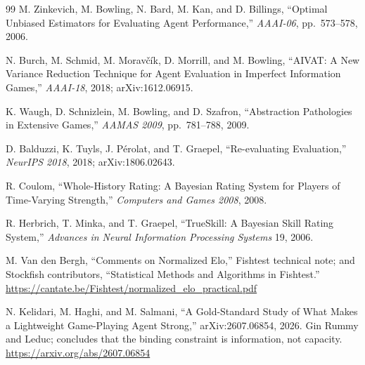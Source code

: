 \begin{thebibliography}{99}
M. Zinkevich, M. Bowling, N. Bard, M. Kan, and D. Billings, ``Optimal Unbiased
Estimators for Evaluating Agent Performance,'' \emph{AAAI-06}, pp.~573--578,
2006.

N. Burch, M. Schmid, M. Morav\v{c}\'ik, D. Morrill, and M. Bowling, ``AIVAT: A
New Variance Reduction Technique for Agent Evaluation in Imperfect Information
Games,'' \emph{AAAI-18}, 2018; arXiv:1612.06915.

K. Waugh, D. Schnizlein, M. Bowling, and D. Szafron, ``Abstraction Pathologies
in Extensive Games,'' \emph{AAMAS 2009}, pp.~781--788, 2009.

D. Balduzzi, K. Tuyls, J. P\'erolat, and T. Graepel, ``Re-evaluating
Evaluation,'' \emph{NeurIPS 2018}, 2018; arXiv:1806.02643.

R. Coulom, ``Whole-History Rating: A Bayesian Rating System for Players of
Time-Varying Strength,'' \emph{Computers and Games 2008}, 2008.

R. Herbrich, T. Minka, and T. Graepel, ``TrueSkill\texttrademark: A Bayesian
Skill Rating System,'' \emph{Advances in Neural Information Processing Systems}
19, 2006.

M. Van den Bergh, ``Comments on Normalized Elo,'' Fishtest technical note; and
Stockfish contributors, ``Statistical Methods and Algorithms in Fishtest.''\\
\url{https://cantate.be/Fishtest/normalized_elo_practical.pdf}

N. Kelidari, M. Haghi, and M. Salmani, ``A Gold-Standard Study of What Makes a
Lightweight Game-Playing Agent Strong,'' arXiv:2607.06854, 2026. Gin Rummy and
Leduc; concludes that the binding constraint is information, not capacity.\\
\url{https://arxiv.org/abs/2607.06854}

\end{thebibliography}
